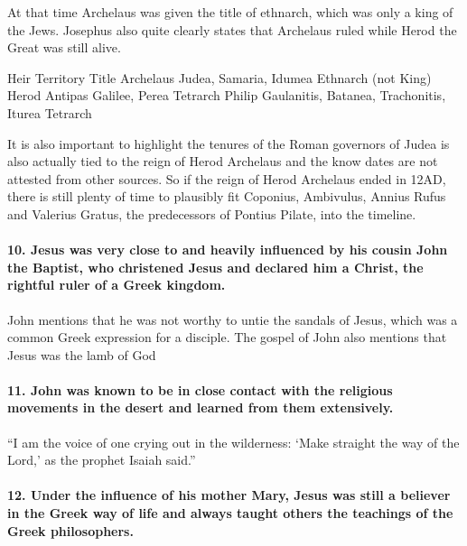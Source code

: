 At that time Archelaus was given the title of ethnarch, which was only a king of the Jews.
Josephus also quite clearly states that Archelaus ruled while Herod the Great was still alive.

Heir Territory Title Archelaus Judea, Samaria, Idumea Ethnarch (not King) Herod Antipas Galilee, Perea Tetrarch Philip Gaulanitis, Batanea, Trachonitis, Iturea Tetrarch

It is also important to highlight the tenures of the Roman governors of Judea is also actually tied to the reign of Herod Archelaus and the know dates are not attested from other sources.
So if the reign of Herod Archelaus ended in 12AD, there is still plenty of time to plausibly fit Coponius, Ambivulus, Annius Rufus and Valerius Gratus, the predecessors of Pontius Pilate, into the timeline.



\paragraph{10.
Jesus was very close to and heavily influenced by his cousin John the Baptist, who christened Jesus and declared him a Christ, the rightful ruler of a Greek kingdom.}\label{par:jesus-was-very-close-to-and-heavily-influenced-by-his-cousin-john-the-baptist-who-christened-jesus-and-declared-him-a-christ-the-rightful-ruler-of-a-greek-kingdom.}

John mentions that he was not worthy to untie the sandals of Jesus, which was a common Greek expression for a disciple.
The gospel of John also mentions that Jesus was the lamb of God

\paragraph{11.
John was known to be in close contact with the religious movements in the desert and learned from them extensively.}\label{par:john-was-known-to-be-in-close-contact-with-the-religious-movements-in-the-desert-and-learned-from-them-extensively.}

``I am the voice of one crying out in the wilderness: `Make straight the way of the Lord,' as the prophet Isaiah said.''

\paragraph{12.
Under the influence of his mother Mary, Jesus was still a believer in the Greek way of life and always taught others the teachings of the Greek philosophers.}\label{par:under-the-influence-of-his-mother-mary-jesus-was-still-a-believer-in-the-greek-way-of-life-and-always-taught-others-the-teachings-of-the-greek-philosophers.}

